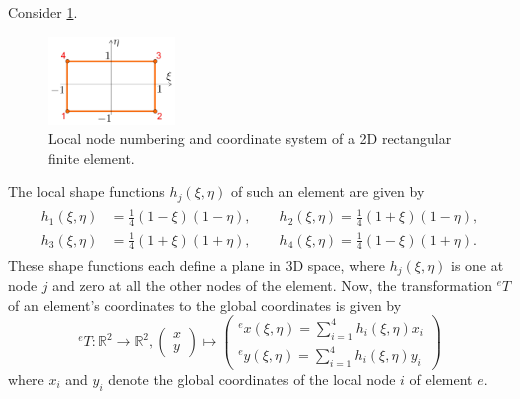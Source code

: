 \documentclass[a4paper,11pt]{article}
\numberwithin{equation}{section}
\begin{document}
{Consider \cref{fig:shapefunct}. \begin{figure}[h]
	\centering
	\includegraphics[width=0.3\textwidth]{figures/shapefunct.png}
	\caption{Local node numbering and coordinate system of a 2D rectangular finite element.}
	\label{fig:shapefunct}
\end{figure}
The local shape functions $ h_j(\xi,\eta)$ of such an element are given by \begin{align}\begin{aligned}
		h_1(\xi,\eta) &= \frac{1}{4}(1-\xi)(1-\eta), \qquad h_2(\xi,\eta) = \frac{1}{4}(1+\xi)(1-\eta), \\
		h_3(\xi,\eta) &= \frac{1}{4}(1+ \xi)(1+\eta), \qquad  h_4(\xi,\eta) = \frac{1}{4}(1-\xi)(1+\eta).
\end{aligned}\end{align} These shape functions each define a plane in 3D space, where $h_j(\xi,\eta)$ is one at node $j$ and zero at all the other nodes of the element. Now, the transformation ${}^e T$ of an element's coordinates to the global coordinates is given by \begin{equation}
	{}^e T : \mathbb{R}^2 \rightarrow \mathbb{R}^2, \begin{pmatrix} x \\ y
	\end{pmatrix} \mapsto \begin{pmatrix}
		{}^e x(\xi,\eta) = \sum_{i=1}^4 h_i(\xi,\eta)x_i \\
		{}^e y(\xi,\eta) = \sum_{i=1}^4 h_i(\xi,\eta)y_i
	\end{pmatrix}
\end{equation} where $x_i$ and $y_i$ denote the global coordinates of the local node $i$ of element $e$.

}
\end{document}
